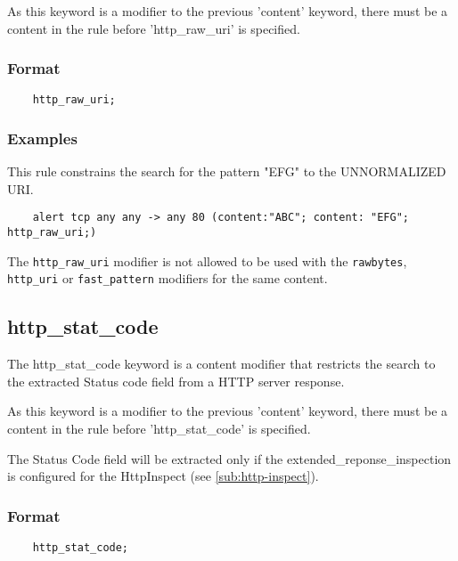 \documentclass[english]{report}
\newenvironment{note}{
\samepage
    \vspace{10pt}{\textsf{
        {\hspace{7pt}\Huge{$\triangle$\hspace{-12.5pt}{\Large{$^!$}}}}\hspace{5pt}
        {\Large{NOTE}}
    }
    }
   \begin{center}
    \par\vspace{-17pt}

    \begin{lrbox}{\savepar}
    \begin{minipage}[r]{6in}
}
{
    \end{minipage}
    \end{lrbox}
    \fbox{
        \usebox{
            \savepar
	}
    }
    \par\vskip10pt
    \end{center}
}
\newenvironment{note}{
        \begin{rawhtml}
        <p><table border="1"><tr><td><b>
        Note:&nbsp;&nbsp;</b>
        \end{rawhtml}
}{
        \begin{rawhtml}
        </b></td></tr></table></p>
        \end{rawhtml}
}
\begin{document}
As this keyword is a modifier to the previous 'content' keyword, there must be
a content in the rule before 'http\_raw\_uri' is specified.

\subsubsection{Format}

\begin{verbatim}
    http_raw_uri;
\end{verbatim}

\subsubsection{Examples}

This rule constrains the search for the pattern "EFG" to the UNNORMALIZED URI.

\begin{verbatim}
    alert tcp any any -> any 80 (content:"ABC"; content: "EFG"; http_raw_uri;)
\end{verbatim}
\begin{note}

The \texttt{http\_raw\_uri} modifier is not allowed to be used with the
\texttt{rawbytes}, \texttt{http\_uri} or \texttt{fast\_pattern} modifiers for the same
content.

\end{note}

\subsection{http\_stat\_code}
\label{sub:HttpStatCode}

The http\_stat\_code keyword is a content modifier that restricts the search to the
extracted Status code field from a HTTP server response.

As this keyword is a modifier to the previous 'content' keyword, there must be
a content in the rule before 'http\_stat\_code' is specified. 

The Status Code field will be extracted only if the extended\_reponse\_inspection is 
configured for the HttpInspect (see \ref{sub:http-inspect}).

\subsubsection{Format}

\begin{verbatim}
    http_stat_code;
\end{verbatim}
\end{document}
